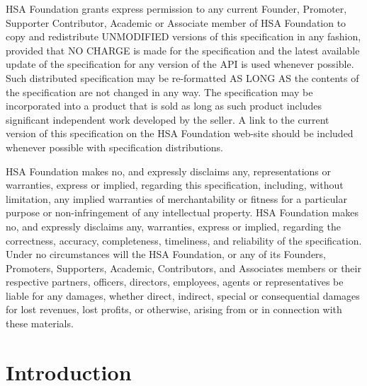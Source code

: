\documentclass[final,oneside]{book}
\begin{document}
HSA Foundation grants express permission to any current Founder, Promoter,
Supporter Contributor, Academic or Associate member of HSA Foundation to copy
and redistribute UNMODIFIED versions of this specification in any fashion,
provided that NO CHARGE is made for the specification and the latest available
update of the specification for any version of the API is used whenever
possible. Such distributed specification may be re-formatted AS LONG AS the
contents of the specification are not changed in any way. The specification may
be incorporated into a product that is sold as long as such product includes
significant independent work developed by the seller. A link to the current
version of this specification on the HSA Foundation web-site should be included
whenever possible with specification distributions.

HSA Foundation makes no, and expressly disclaims any, representations or
warranties, express or implied, regarding this specification, including, without
limitation, any implied warranties of merchantability or fitness for a
particular purpose or non-infringement of any intellectual property. HSA
Foundation makes no, and expressly disclaims any, warranties, express or
implied, regarding the correctness, accuracy, completeness, timeliness, and
reliability of the specification. Under no circumstances will the HSA
Foundation, or any of its Founders, Promoters, Supporters, Academic,
Contributors, and Associates members or their respective partners, officers,
directors, employees, agents or representatives be liable for any damages,
whether direct, indirect, special or consequential damages for lost revenues,
lost profits, or otherwise, arising from or in connection with these materials.

\clearpage
{}
{} %
\tableofcontents

\clearpage
{}
\setcounter{page}{1}

\chapter{Introduction} \label{index}
\vspace{-7mm}
\end{document}
